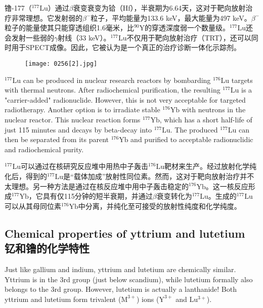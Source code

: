 \documentclass[dvipsnames, svgnames,a4paper,11pt]{article}
\begin{document}
镥-177（\(\mathrm{^{177}Lu}\)）通过$\beta$衰变衰变为铪（Hf），半衰期为6.64天，这对于靶向放射治疗非常理想。它发射弱的\(\beta^-\)粒子，平均能量为133.6 keV，最大能量为497 keV。\(\beta^-\)粒子的能量使其只能穿透组织1.6毫米，比\(\mathrm{^{90}Y}\)的穿透深度弱一个数量级。\(\mathrm{^{177}Lu}\)还会发射一些弱的$\gamma$射线（33 keV）。\(\mathrm{^{177}Lu}\)不仅用于靶向放射治疗（TRT），还可以同时用于SPECT成像。因此，它被认为是一个真正的治疗诊断一体化示踪剂。

\begin{figure}[h]
	\centering
    \texttt{[image: 0256[2].jpg]}  
     \label{fig345}
\end{figure}

\(\mathrm{^{177}Lu}\) can be produced in nuclear research reactors by bombarding \(\mathrm{^{176}Lu}\) targets with thermal neutrons. After radiochemical purification, the resulting \(\mathrm{^{177}Lu}\) is a "carrier-added" radionuclide. However, this is not very acceptable for targeted radiotherapy. Another option is to irradiate stable \(\mathrm{^{176}Yb}\) with neutrons in the nuclear reactor. This nuclear reaction forms \(\mathrm{^{177}Yb}\), which has a short half-life of just 115 minutes and decays by beta-decay into \(\mathrm{^{177}Lu}\). The produced \(\mathrm{^{177}Lu}\) can then be separated from its parent \(\mathrm{^{176}Yb}\) and purified to acceptable radionuclidic and radiochemical purity.

\(\mathrm{^{177}Lu}\)可以通过在核研究反应堆中用热中子轰击\(\mathrm{^{176}Lu}\)靶材来生产。经过放射化学纯化后，得到的\(\mathrm{^{177}Lu}\)是“载体加成”放射性同位素。然而，这对于靶向放射治疗并不太理想。另一种方法是通过在核反应堆中用中子轰击稳定的\(\mathrm{^{176}Yb}\)。这一核反应形成\(\mathrm{^{177}Yb}\)，它具有仅115分钟的短半衰期，并通过$\beta$衰变转化为\(\mathrm{^{177}Lu}\)。生成的\(\mathrm{^{177}Lu}\)可以从其母同位素\(\mathrm{^{176}Yb}\)中分离，并纯化至可接受的放射性纯度和化学纯度。

\subsection{Chemical properties of yttrium and lutetium\\ 钇和镥的化学特性}  
Just like gallium and indium, yttrium and lutetium are chemically similar. Yttrium is in the 3rd group (just below scandium), while lutetium formally also belongs to the 3rd group. However, lutetium is actually a lanthanide! Both yttrium and lutetium form trivalent (\(\mathrm{M^{3+}}\)) ions (\(\mathrm{Y^{3+}}\) and \(\mathrm{Lu^{3+}}\)).
\end{document}
